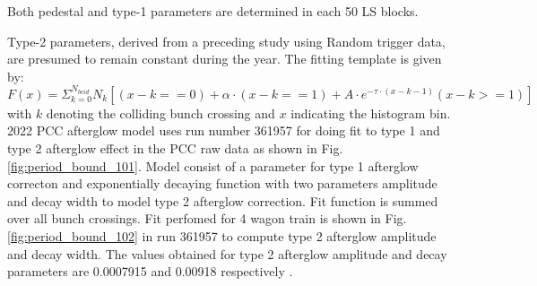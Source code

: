 Both pedestal and type-1 parameters are determined in each 50 LS blocks.

Type-2 parameters, derived from a preceding study using Random trigger data, are presumed to remain constant during the year. The fitting template is given by:
\begin{equation}
F(x) = \Sigma_{k=0}^{N_{bcid}} N_k \left[(x-k==0)+\alpha\cdot(x-k==1)+A \cdot e^{-\tau\cdot(x-k-1)}(x-k>=1) \right]
\end{equation}
with $k$ denoting the colliding bunch crossing and $x$ indicating the histogram bin. 2022 PCC afterglow model uses run number 361957 for doing fit to type 1 and type 2 afterglow effect in the PCC raw data as shown in Fig. \ref{fig:period_bound_101}. Model consist of a parameter for type 1 afterglow correcton and exponentially decaying function with two parameters amplitude and decay width to model type 2 afterglow correction. Fit function is summed over all bunch crossings. Fit perfomed for 4 wagon train is shown in Fig.  \ref{fig:period_bound_102} in run 361957 to compute type 2 afterglow amplitude and decay width. The values obtained for type 2 afterglow amplitude and decay parameters are 0.0007915 and 0.00918 respectively \cite{pas_22}. %

